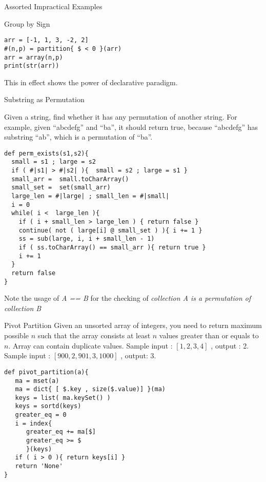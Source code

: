 \begin{section}{Assorted Impractical Examples}
\begin{subsection}{Group by Sign}
\begin{center}\begin{minipage}{\linewidth}
\begin{lstlisting}[style=JexlStyle]
arr = [-1, 1, 3, -2, 2] 
#(n,p) = partition{ $ < 0 }(arr)
arr = array(n,p)
print(str(arr))
\end{lstlisting}  
\end{minipage}\end{center} 
This in effect shows the power of declarative paradigm.
\end{subsection}

\begin{subsection}{Substring as Permutation}

Given a string, find whether it has any permutation of another string. 
For example, given ``abcdefg'' and ``ba'', it should return true, 
because ``abcdefg'' has substring ``ab'', which is a permutation of ``ba''.

\begin{center}\begin{minipage}{\linewidth}
\begin{lstlisting}[style=JexlStyle]
def perm_exists(s1,s2){
  small = s1 ; large = s2 
  if ( #|s1| > #|s2| ){  small = s2 ; large = s1 }
  small_arr =  small.toCharArray()
  small_set =  set(small_arr)
  large_len = #|large| ; small_len = #|small|
  i = 0 
  while( i <  large_len ){
    if ( i + small_len > large_len ) { return false } 
    continue( not ( large[i] @ small_set ) ){ i += 1 }
    ss = sub(large, i, i + small_len - 1)
    if ( ss.toCharArray() == small_arr ){ return true }
    i += 1
  }
  return false 
}
\end{lstlisting}  
\end{minipage}\end{center} 
Note the usage of \emph{A == B } for the checking of \emph{collection A is a permutation of collection B}
\end{subsection}

\begin{subsection}{Pivot Partition}
Given an unsorted array of integers, you need to return maximum possible $n$ 
such that the array consists at least $n$ values greater than or equals to $n$. 
Array can contain duplicate values. 
Sample input : $[1, 2, 3, 4]$ , output : 2. 
Sample input : $[900, 2, 901, 3, 1000]$ , output: 3.

\begin{center}\begin{minipage}{\linewidth}
\begin{lstlisting}[style=JexlStyle]
def pivot_partition(a){
   ma = mset(a)
   ma = dict{ [ $.key , size($.value)] }(ma)
   keys = list( ma.keySet() )
   keys = sortd(keys)
   greater_eq = 0 
   i = index{
      greater_eq += ma[$]
      greater_eq >= $  
      }(keys)
   if ( i > 0 ){ return keys[i] }
   return 'None'
}
\end{lstlisting}  
\end{minipage}\end{center} 



\end{subsection}
\end{section}
